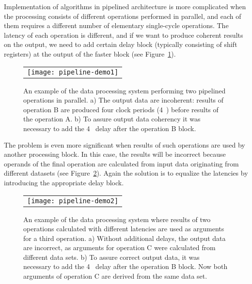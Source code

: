 \documentclass[preprint,11pt]{elsarticle}
\begin{document}
 Implementation of algorithms in pipelined architecture is more complicated when    
 the processing consists of different operations performed in parallel,
 and each of them requires a different number of elementary
 single-cycle operations. 
 The latency of each operation is different, and if we want to produce coherent results 
 on the output, we need to add certain delay block (typically consisting of shift registers)
 at the output of the faster block (see Figure~\ref{fig:pipeline-demo1}).
 
 \begin{figure}[t]
 {   
 \begin{center}
    \begin{tabular}{c}
    \texttt{[image: pipeline-demo1]}
    \end{tabular}
    \end{center}
    \caption
    { \label{fig:pipeline-demo1}
     An example of the data processing system performing two pipelined operations
     in parallel.
     a) The output data are incoherent: results of operation B are produced four clock
     periods (4~) before results of the operation A.
     b) To assure output data coherency it was necessary to add the 4~ delay 
     after the operation B block.
    }
 }
 \end{figure}
 The problem is even more significant when results of such operations are used by another
 processing block. In this case, the results will be incorrect because operands 
 of the final operation are calculated from input data originating from
 different datasets (see Figure~\ref{fig:pipeline-demo2}).
 Again the solution is to equalize the latencies by introducing the appropriate delay block.
 \begin{figure}[t]
 {   
 \begin{center}
    \begin{tabular}{c}
    \texttt{[image: pipeline-demo2]}
    \end{tabular}
    \end{center}
    \caption
    { \label{fig:pipeline-demo2}
     An example of the data processing system where results of two operations calculated with 
     different latencies are used as arguments for a third operation.
     a) Without additional delays, the output data are incorrect, as arguments for operation C were calculated from different data sets.
     b) To assure correct output data, it was necessary to add the 4~ delay 
     after the operation B block. Now both arguments of operation C are derived from the same
     data set.
    }
 }
 \end{figure}
\end{document}
